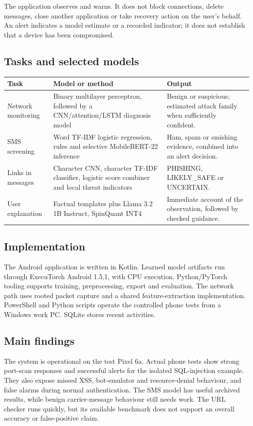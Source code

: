 \documentclass[11pt,a4paper]{article}
\begin{document}
The application observes and warns. It does not block connections, delete messages,
close another application or take recovery action on the user's behalf.
An alert indicates a model estimate or a recorded indicator; it does not establish that a device has been compromised.

\subsection*{Tasks and selected models}
\begin{tabularx}{\textwidth}{@{}L{28mm}YY@{}}
\toprule Task & Model or method & Output \\\midrule
Network monitoring & Binary multilayer perceptron, followed by a CNN/attention/LSTM diagnosis model & Benign or suspicious; estimated attack family when sufficiently confident.\\
SMS screening & Word TF-IDF logistic regression, rules and selective MobileBERT-22 inference & Ham, spam or smishing evidence, combined into an alert decision.\\
Links in messages & Character CNN, character TF-IDF classifier, logistic score combiner and local threat indicators & PHISHING, LIKELY\_SAFE or UNCERTAIN.\\
User explanation & Factual templates plus Llama 3.2 1B Instruct, SpinQuant INT4 & Immediate account of the observation, followed by checked guidance.\\
\bottomrule
\end{tabularx}

\subsection*{Implementation}
The Android application is written in Kotlin. Learned model artifacts run through
ExecuTorch Android 1.5.1, with CPU execution. Python/PyTorch tooling supports training,
preprocessing, export and evaluation. The network path uses rooted packet capture
and a shared feature-extraction implementation. PowerShell and Python scripts operate
the controlled phone tests from a Windows work PC. SQLite stores recent activities.

\subsection*{Main findings}
The system is operational on the test Pixel 6a. Actual phone tests show strong port-scan
responses and successful alerts for the isolated SQL-injection example. They also expose
missed XSS, bot-emulator and resource-denial behaviour, and false alarms during normal
authentication. The SMS model has useful archived results, while benign carrier-message
behaviour still needs work. The URL checker runs quickly, but its available benchmark
does not support an overall accuracy or false-positive claim.
\end{document}
